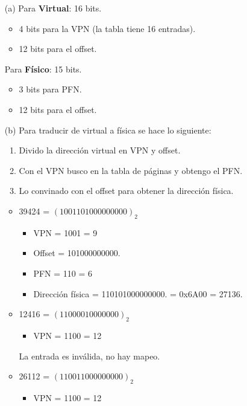 \documentclass[12pt]{article}
\begin{document}
\begin{rta}
    \begin{itemize}
        \item[(a)] Para \textbf{Virtual}: 16 bits. 
        \begin{itemize}
            \item 4 bits para la VPN (la tabla tiene 16 entradas).
            \item 12 bits para el offset.
        \end{itemize}
        Para \textbf{Físico}: 15 bits.
        \begin{itemize}
            \item 3 bits para PFN. 
            \item 12 bits para el offset.
        \end{itemize}
        \item[(b)] Para traducir de virtual a física se hace lo siguiente:
        \begin{enumerate}
            \item Divido la dirección virtual en VPN y offset.
            \item Con el VPN busco en la tabla de páginas y obtengo el PFN.
            \item Lo convinado con el offset para obtener la dirección física.
        \end{enumerate}
        \begin{itemize}
            \item 39424 = $(1001101000000000)_{2}$
            \begin{itemize}
                \item VPN = 1001 = 9
                \item Offset = 101000000000.
                \item PFN = 110 = 6
                \item Dirección física = 110101000000000. = 0x6A00 = 27136.
            \end{itemize}
            \item 12416 = $(11000010000000)_2$
            \begin{itemize}
                \item VPN = 1100 = 12
            \end{itemize}
            La entrada es inválida, no hay mapeo.
            \item 26112 = $(110011000000000)_2$
            \begin{itemize}
                \item VPN = 1100 = 12

\end{itemize}
\end{itemize}
\end{itemize}
\end{rta}
\end{document}
